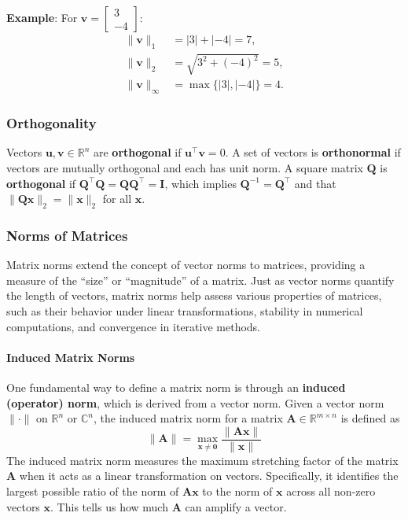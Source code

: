 \begin{exampleBox}
    \textbf{Example}: For $ \mathbf{v} = \begin{bmatrix}3 \\ -4\end{bmatrix} $:
    \begin{align*}
        \|\mathbf{v}\|_1 &= |3| + |-4| = 7, \\
        \|\mathbf{v}\|_2 &= \sqrt{3^2 + (-4)^2} = 5, \\
        \|\mathbf{v}\|_\infty &= \max\{ |3|, |-4| \} = 4.
    \end{align*}
\end{exampleBox}

\subsubsection{Orthogonality}
Vectors $ \mathbf{u}, \mathbf{v} \in \mathbb{R}^n $ are \textbf{orthogonal} if $ \mathbf{u}^\top \mathbf{v} = 0 $. A set of vectors is \textbf{orthonormal} if vectors are mutually orthogonal and each has unit norm. A square matrix $ \mathbf{Q} $ is \textbf{orthogonal} if $ \mathbf{Q}^\top \mathbf{Q} = \mathbf{Q}\mathbf{Q}^\top = \mathbf{I} $, which implies $ \mathbf{Q}^{-1} = \mathbf{Q}^\top $ and that $ \|\mathbf{Q}\mathbf{x}\|_2 = \|\mathbf{x}\|_2 $ for all $ \mathbf{x} $.

\subsubsection{Norms of Matrices}
Matrix norms extend the concept of vector norms to matrices, providing a measure of the ``size'' or ``magnitude'' of a matrix. Just as vector norms quantify the length of vectors, matrix norms help assess various properties of matrices, such as their behavior under linear transformations, stability in numerical computations, and convergence in iterative methods.

\paragraph{Induced Matrix Norms}
One fundamental way to define a matrix norm is through an \textbf{induced (operator) norm}, which is derived from a vector norm. Given a vector norm $ \|\cdot\| $ on $ \mathbb{R}^n $ or $ \mathbb{C}^n $, the induced matrix norm for a matrix $ \mathbf{A} \in \mathbb{R}^{m \times n} $ is defined as
\begin{equation*}
    \|\mathbf{A}\| = \max_{\mathbf{x} \neq \mathbf{0}} \frac{\|\mathbf{A}\mathbf{x}\|}{\|\mathbf{x}\|}
\end{equation*}
The induced matrix norm measures the maximum stretching factor of the matrix $ \mathbf{A} $ when it acts as a linear transformation on vectors. Specifically, it identifies the largest possible ratio of the norm of $ \mathbf{A}\mathbf{x} $ to the norm of $ \mathbf{x} $ across all non-zero vectors $ \mathbf{x} $. This tells us how much $ \mathbf{A} $ can amplify a vector.

